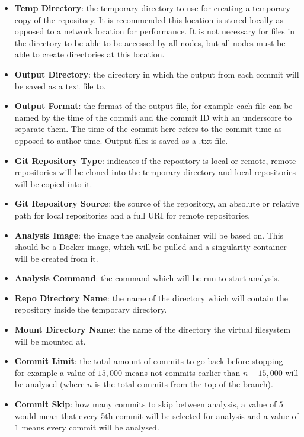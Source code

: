 \begin{itemize}
    \item \textbf{Temp Directory}: the temporary directory to use for creating a temporary copy of the repository.
          It is recommended this location is stored locally as opposed to a network location for performance.
          It is not necessary for files in the directory to be able to be accessed by all nodes, but all nodes must be able to create directories at this location.
    \item \textbf{Output Directory}: the directory in which the output from each commit will be saved as a text file to.
    \item \textbf{Output Format}: the format of the output file, for example each file can be named by the time of the commit and the commit ID with an underscore to separate them.
          The time of the commit here refers to the commit time as opposed to author time.
          Output files is saved as a .txt file.
    \item \textbf{Git Repository Type}: indicates if the repository is local or remote, remote repositories will be cloned into the temporary directory and local repositories will be copied into it.
    \item \textbf{Git Repository Source}: the source of the repository, an absolute or relative path for local repositories and a full URI for remote repositories.
    \item \textbf{Analysis Image}: the image the analysis container will be based on.
          This should be a Docker image, which will be pulled and a singularity container will be created from it.
    \item \textbf{Analysis Command}: the command which will be run to start analysis.
    \item \textbf{Repo Directory Name}: the name of the directory which will contain the repository inside the temporary directory.
    \item \textbf{Mount Directory Name}: the name of the directory the virtual filesystem will be mounted at.
    \item \textbf{Commit Limit}: the total amount of commits to go back before stopping - for example a value of $ 15,000 $ means not commits earlier than $ n - 15,000 $ will be analysed (where $ n $ is the total commits from the top of the branch).
    \item \textbf{Commit Skip}: how many commits to skip between analysis, a value of $ 5 $ would mean that every 5th commit will be selected for analysis and a value of $ 1 $ means every commit will be analysed.
\end{itemize}

